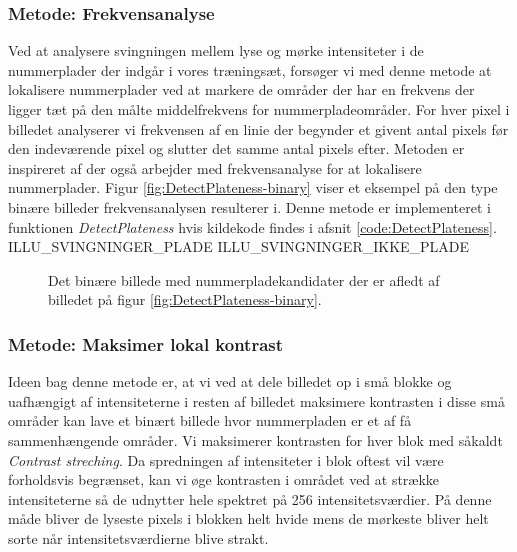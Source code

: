 \subsubsection{Metode: Frekvensanalyse}
\label{sec:DetectPlateness}
Ved at analysere svingningen mellem lyse og mørke intensiteter i de nummerplader der indgår i vores træningsæt, forsøger vi med denne metode at lokalisere nummerplader ved at markere de områder der har en frekvens der ligger tæt på den målte middelfrekvens for nummerpladeområder.  For hver pixel i billedet analyserer vi frekvensen af en linie der begynder et givent antal pixels før den indeværende pixel og slutter det samme antal pixels efter. Metoden er inspireret af \cite{kwas} der også arbejder med frekvensanalyse for at lokalisere nummerplader. Figur \vref{fig:DetectPlateness-binary} viser et eksempel på den type binære billeder frekvensanalysen resulterer i. Denne metode er implementeret i funktionen \textit{DetectPlateness} hvis kildekode findes i afsnit \vref{code:DetectPlateness}.
ILLU\_SVINGNINGER\_PLADE
ILLU\_SVINGNINGER\_IKKE\_PLADE
\begin{figure}[htp]
  \centering
  \caption{Det binære billede med nummerpladekandidater der er afledt af billedet på figur \vref{fig:DetectPlateness-binary}.}
  \label{fig:DetectPlateness-binary}
\end{figure}

\subsubsection{Metode: Maksimer lokal kontrast}
Ideen bag denne metode er, at vi ved at dele billedet op i små blokke og uafhængigt af intensiteterne i resten af billedet maksimere kontrasten i disse små områder kan lave et binært billede hvor nummerpladen er et af få sammenhængende områder. Vi maksimerer kontrasten for hver blok med såkaldt \textit{Contrast streching}. Da spredningen af intensiteter i blok oftest vil være forholdsvis begrænset, kan vi øge kontrasten i området ved at strække intensiteterne så de udnytter hele spektret på 256 intensitetsværdier. På denne måde bliver de lyseste pixels i blokken helt hvide  mens de mørkeste bliver helt sorte når intensitetsværdierne blive strakt.   

